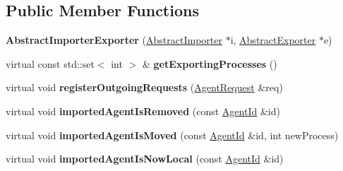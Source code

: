 \subsection*{Public Member Functions}
\begin{DoxyCompactItemize}
\item 
\hypertarget{classrepast_1_1_abstract_importer_exporter_ac873303b2cf649afd26ea93b790494a8}{{\bfseries Abstract\-Importer\-Exporter} (\hyperlink{classrepast_1_1_abstract_importer}{Abstract\-Importer} $\ast$i, \hyperlink{classrepast_1_1_abstract_exporter}{Abstract\-Exporter} $\ast$e)}\label{classrepast_1_1_abstract_importer_exporter_ac873303b2cf649afd26ea93b790494a8}

\item 
\hypertarget{classrepast_1_1_abstract_importer_exporter_a6d77b384448820417925f286a9cf21ea}{virtual const std\-::set$<$ int $>$ \& {\bfseries get\-Exporting\-Processes} ()}\label{classrepast_1_1_abstract_importer_exporter_a6d77b384448820417925f286a9cf21ea}

\item 
\hypertarget{classrepast_1_1_abstract_importer_exporter_a599da36e52d78fbabfd3709d9f68a188}{virtual void {\bfseries register\-Outgoing\-Requests} (\hyperlink{classrepast_1_1_agent_request}{Agent\-Request} \&req)}\label{classrepast_1_1_abstract_importer_exporter_a599da36e52d78fbabfd3709d9f68a188}

\item 
\hypertarget{classrepast_1_1_abstract_importer_exporter_a37f4c70de603140adb08b31097cad4f2}{virtual void {\bfseries imported\-Agent\-Is\-Removed} (const \hyperlink{classrepast_1_1_agent_id}{Agent\-Id} \&id)}\label{classrepast_1_1_abstract_importer_exporter_a37f4c70de603140adb08b31097cad4f2}

\item 
\hypertarget{classrepast_1_1_abstract_importer_exporter_a78e60fce871101a398153fa5d8b724f7}{virtual void {\bfseries imported\-Agent\-Is\-Moved} (const \hyperlink{classrepast_1_1_agent_id}{Agent\-Id} \&id, int new\-Process)}\label{classrepast_1_1_abstract_importer_exporter_a78e60fce871101a398153fa5d8b724f7}

\item 
\hypertarget{classrepast_1_1_abstract_importer_exporter_abdbc81ef948b0f332acb99fc4cc9d73a}{virtual void {\bfseries imported\-Agent\-Is\-Now\-Local} (const \hyperlink{classrepast_1_1_agent_id}{Agent\-Id} \&id)}\label{classrepast_1_1_abstract_importer_exporter_abdbc81ef948b0f332acb99fc4cc9d73a}


\end{DoxyCompactItemize}
